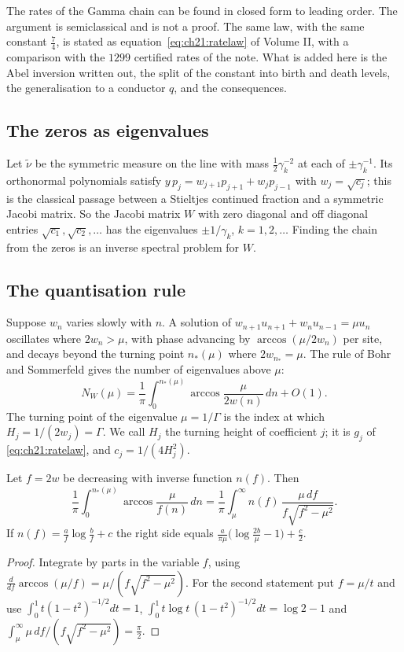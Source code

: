 The rates of the Gamma chain can be found in closed form to leading order. The argument is semiclassical and is not a proof. The same law, with the same constant $\frac74$, is stated as equation~\eqref{eq:ch21:ratelaw} of Volume II, with a comparison with the $1299$ certified rates of the note. What is added here is the Abel inversion written out, the split of the constant into birth and death levels, the generalisation to a conductor $q$, and the consequences.

\subsection{The zeros as eigenvalues}

Let $\tilde\nu$ be the symmetric measure on the line with mass $\frac12\gamma_k^{-2}$ at each of $\pm\gamma_k^{-1}$. Its orthonormal polynomials satisfy $y\,p_j=w_{j+1}p_{j+1}+w_jp_{j-1}$ with $w_j=\sqrt{c_j}$; this is the classical passage between a Stieltjes continued fraction and a symmetric Jacobi matrix. So the Jacobi matrix $W$ with zero diagonal and off diagonal entries $\sqrt{c_1},\sqrt{c_2},\dots$ has the eigenvalues $\pm1/\gamma_k$, $k=1,2,\dots$ Finding the chain from the zeros is an inverse spectral problem for $W$.

\subsection{The quantisation rule}

Suppose $w_n$ varies slowly with $n$. A solution of $w_{n+1}u_{n+1}+w_nu_{n-1}=\mu u_n$ oscillates where $2w_n>\mu$, with phase advancing by $\arccos(\mu/2w_n)$ per site, and decays beyond the turning point $n_*(\mu)$ where $2w_{n_*}=\mu$. The rule of Bohr and Sommerfeld gives the number of eigenvalues above $\mu$:
\begin{equation}\label{b:eq:BS}
N_W(\mu)=\frac1\pi\int_0^{n_*(\mu)}\arccos\frac{\mu}{2w(n)}\,dn+O(1).
\end{equation}
The turning point of the eigenvalue $\mu=1/\Gamma$ is the index at which $H_j=1/(2w_j)=\Gamma$. We call $H_j$ the turning height of coefficient $j$; it is $g_j$ of \eqref{eq:ch21:ratelaw}, and $c_j=1/(4H_j^2)$.

\begin{lemma}\label{b:lem:abel}
Let $f=2w$ be decreasing with inverse function $n(f)$. Then
\[
\frac1\pi\int_0^{n_*(\mu)}\arccos\frac{\mu}{f(n)}\,dn
=\frac1\pi\int_\mu^\infty n(f)\,\frac{\mu\,df}{f\sqrt{f^2-\mu^2}} .
\]
If $n(f)=\frac af\log\frac bf+c$ the right side equals $\frac{a}{\pi\mu}\bigl(\log\frac{2b}{\mu}-1\bigr)+\frac c2$.
\end{lemma}
\begin{proof}
Integrate by parts in the variable $f$, using $\frac{d}{df}\arccos(\mu/f)=\mu/(f\sqrt{f^2-\mu^2})$. For the second statement put $f=\mu/t$ and use $\int_0^1t(1-t^2)^{-1/2}dt=1$, $\int_0^1t\log t\,(1-t^2)^{-1/2}dt=\log2-1$ and $\int_\mu^\infty\mu\,df/(f\sqrt{f^2-\mu^2})=\frac\pi2$.
\end{proof}

